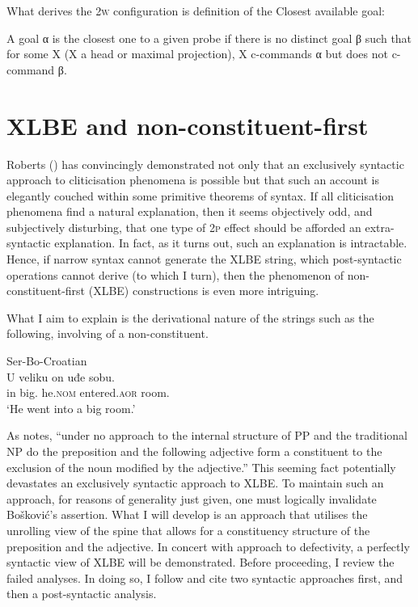 \documentclass[output=paper]{langsci/langscibook}
\begin{document}
What derives the \textsc{2w} configuration is
 definition of the Closest available goal:

\begin{exe}
	\ex A goal α is the closest one to a given probe if there is no distinct
    goal β such that for some X (X a head or maximal projection), X c-commands
    α but does not c-command β. \citep[579]{RackRich2005}
\end{exe}

\section{XLBE and non-constituent-first}\label{sec:xlbe}

Roberts (\citeyear{Roberts2010,roberts:2012uq}) has convincingly demonstrated
not only that an exclusively syntactic approach to cliticisation
phenomena is possible but that such an account is elegantly couched within some
primitive theorems of syntax. If all cliticisation phenomena find a
natural explanation, then it seems objectively odd, and subjectively
disturbing, that one type of \textsc{2p} effect should be afforded an
extra-syntactic explanation. In fact, as it turns out, such an explanation is
intractable.  Hence, if narrow syntax cannot generate the XLBE string, which
post-syntactic operations cannot derive (to which I turn), then the phenomenon
of non-constituent-first (XLBE) constructions is even more intriguing.

What I aim to explain is the derivational nature of the strings such as the
following, involving  of a non-constituent.

\begin{exe}
    \ex Ser-Bo-Croatian\\
    \gll U veliku on uđe sobu.  \\
	in big.\Loc{}  he.\textsc{nom} entered.\textsc{aor} room.\Loc{} \\
	\trans `He went into a big room.' \hfill \citep[30n78]{Boskovic:2005}

\end{exe}

As \citet[30]{Boskovic:2005} notes, ``under no approach to the internal
structure of PP and the traditional NP do the preposition and the following
adjective form a constituent to the exclusion of the noun modified by the
adjective.'' This seeming fact potentially devastates an exclusively syntactic
approach to XLBE\@. To maintain such an approach, for reasons of generality
just given, one must logically invalidate Bošković's assertion. What I will
develop is an approach that utilises the unrolling view of the spine that
allows for a constituency structure of the preposition and the adjective.  In
concert with  approach to defectivity, a perfectly
syntactic view of XLBE will be demonstrated. Before proceeding, I review the
failed analyses. In doing so, I follow \citet[30ff.]{Boskovic:2005} and cite
two syntactic approaches first, and then a post-syntactic analysis.
\end{document}
